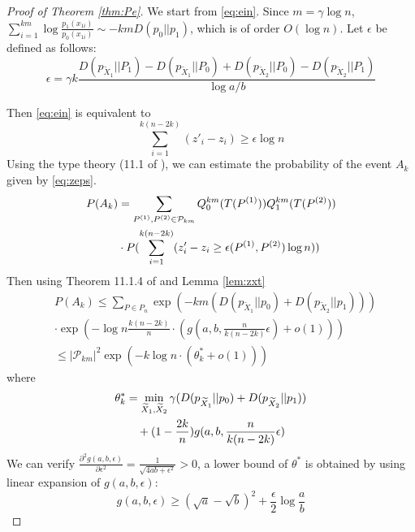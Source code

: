 \documentclass[conference]{IEEEtran}
\begin{document}
\begin{proof}[Proof of Theorem \ref{thm:Pe}]
We start from \eqref{eq:ein}.
Since $m=\gamma \log n$, $\sum_{i=1}^{km} \log \frac{p_1(x_{1i})}{p_0(x_{1i})} \sim
-km D(p_0 || p_1)$, which is of order $O(\log n)$.
Let $\epsilon$ be defined as follows:
\begin{equation}
\epsilon = \gamma k\frac{D(p_{\widetilde{X}_1} || P_1) - D(p_{\widetilde{X}_1} || P_0) + D(p_{\widetilde{X}_2} || P_0) - D(p_{\widetilde{X}_2} || P_1)}{\log a /b}
\end{equation}

Then \eqref{eq:ein} is equivalent to
\begin{equation}\label{eq:zeps}
\sum_{i=1}^{k(n-2k)}(z'_{i} - z_{i}) \geq \epsilon \log n
\end{equation}
Using the type theory (11.1 of \cite{cover1999elements}), we can estimate the probability of the event $A_k$ given by \eqref{eq:zeps}.
\begin{align}
P(A_k) & =  \sum_{P^{(1)},P^{(2)}\in \mathcal{P}_{km}} Q_0^{km}(T(P^{(1)}))Q_1^{km}(T(P^{(2)}))\notag \\
& \cdot P(\sum_{i=1}^{k(n-2k)} (z'_{i} - z_{i} \geq \epsilon(P^{(1)}, P^{(2)})  \log n ))\label{eq:decomp} 
\end{align}
Then using Theorem 11.1.4 of \cite{cover1999elements} and Lemma \ref{lem:zxt} 
\begin{align*}
&P(A_k)  \leq \sum_{P \in P_n} \exp(-km (D(p_{\widetilde{X}_1} || p_0) + D(p_{\widetilde{X}_2} || p_1))) \\
& \cdot \exp(-\log n \frac{k(n-2k)}{n}\cdot (g(a, b, \frac{n}{k(n-2k)}\epsilon) + o(1))) \\
&\leq |\mathcal{P}_{km}|^2 \exp(-k\log n \cdot (\theta^*_k + o(1))) 
\end{align*}
where
\begin{align}
\theta^*_k &= \min_{\widetilde{X}_1,\widetilde{X}_2} \gamma (D(p_{\widetilde{X}_1}|| p_0) + D(p_{\widetilde{X}_2} || p_1)) \notag \\
&\quad + (1-\frac{2k}{n}) g(a,b, \frac{n}{k(n-2k)}\epsilon) \label{eq:theta_star}
\end{align}
We can verify $\frac{\partial^2 g(a,b,\epsilon)}{\partial \epsilon^2} =\frac{1}{\sqrt{4ab+\epsilon^2}}> 0$,
a lower bound of $\theta^*$ is obtained by using linear expansion of $g(a,b, \epsilon)$:
\begin{equation}\label{eq:g_linear}
g(a,b,\epsilon) \geq  (\sqrt{a} - \sqrt{b})^2 + \frac{\epsilon}{2}\log \frac{a}{b} 
\end{equation}

\end{proof}
\end{document}
